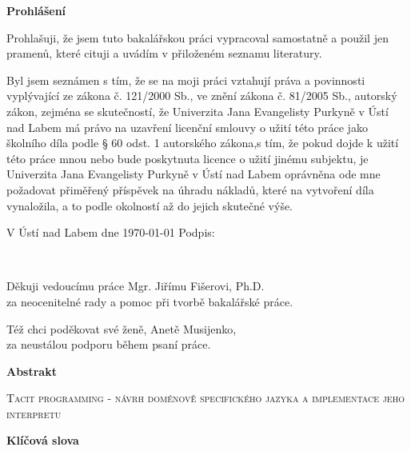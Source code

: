 \documentclass[male,czech]{kithesis}
\newcommand{\TITULcz}{Tacit programming - návrh doménově specifického jazyka a implementace jeho interpretu} %
\begin{document}
\cleardoublepage
\thispagestyle{empty}

\textbf{Prohlášení}

Prohlašuji, že jsem tuto bakalářskou práci vypracoval samostatně a použil
jen pramenů, které cituji a uvádím v přiloženém seznamu literatury.

\vspace{1em}
Byl jsem seznámen s tím, že se na moji práci vztahují práva a povinnosti vyplývající ze zákona č. 121/2000 Sb., ve znění zákona č. 81/2005 Sb., autorský zákon, zejména se skutečností, že Univerzita Jana Evangelisty Purkyně v Ústí nad Labem má právo na uzavření licenční smlouvy o užití této práce jako školního díla podle § 60 odst. 1 autorského zákona,s tím, že pokud dojde k užití této práce mnou nebo bude poskytnuta licence o užití jinému
subjektu, je Univerzita Jana Evangelisty Purkyně v Ústí nad Labem oprávněna ode mne požadovat přiměřený příspěvek na úhradu nákladů, které na vytvoření díla vynaložila, a to podle okolností až do jejich skutečné výše.

\vspace{1em}
V Ústí nad Labem dne \today \hspace{0.3\textwidth} Podpis:


\clearpage
\thispagestyle{empty}
~\vfill

\begin{flushright}
  Děkuji vedoucímu práce Mgr. Jiřímu Fišerovi, Ph.D.\\ za neocenitelné rady a pomoc při tvorbě bakalářské práce.

  Též chci poděkovat své ženě, Anetě Musijenko, \\ za neustálou podporu během psaní práce.
\end{flushright}

\cleardoublepage
\thispagestyle{empty}

\textbf{\textsf{Abstrakt}}

\textsc{\TITULcz}


\textbf{\textsf{Klíčová slova}}

\end{document}

